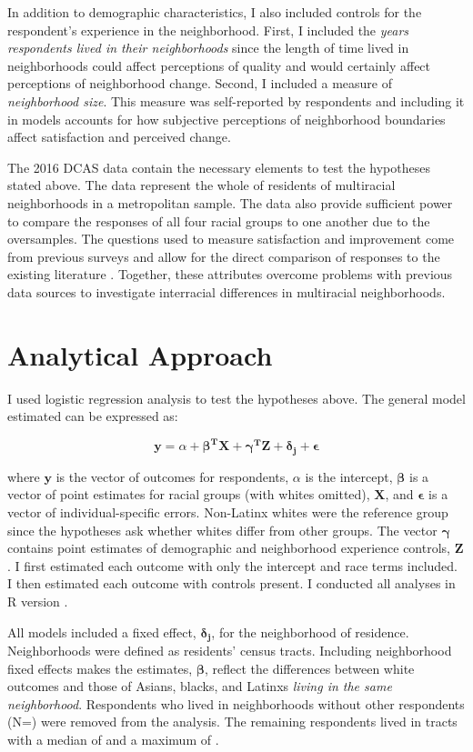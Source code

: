 \documentclass{baderart}
\renewcommand{\needcite}[1][]{%
	\strong{[CITE: %
		\ifthenelse{\equal{#1}{}}{}{: #1}	%
	]}}
\begin{document}
In addition to demographic characteristics, I also included controls for the respondent's experience in the neighborhood. First, I included the \emph{years respondents lived in their neighborhoods} since the length of time lived in neighborhoods could affect perceptions of quality and would certainly affect perceptions of neighborhood change. Second, I included a measure of \emph{neighborhood size}. This measure was self-reported by respondents and including it in models accounts for how subjective perceptions of neighborhood boundaries affect satisfaction and perceived change.

The 2016 DCAS data contain the necessary elements to test the hypotheses stated above. The data represent the whole of residents of multiracial neighborhoods in a metropolitan sample. The data also provide sufficient power to compare the responses of all four racial groups to one another due to the oversamples. The questions used to measure satisfaction and improvement come from previous surveys and allow for the direct comparison of responses to the existing literature\needcite. Together, these attributes overcome problems with previous data sources to investigate interracial differences in multiracial neighborhoods.

\section{Analytical Approach}\label{analytical-approach}

I used logistic regression analysis to test the hypotheses above. The general model estimated can be expressed as:

\[\mathbf{y} = \alpha + \mathbf{\beta^T X} + \mathbf{\gamma^T Z} + \mathbf{\delta_j} + \mathbf{\epsilon}\]

\noindent where \(\mathbf{y}\) is the vector of outcomes for respondents, \(\alpha\) is the intercept, \(\mathbf{\beta}\) is a vector of point estimates for racial groups (with whites omitted), \(\mathbf{X}\), and \(\mathbf{\epsilon}\) is a vector of individual-specific errors. Non-Latinx whites were the reference group since the hypotheses ask whether whites differ from other groups. The vector \(\mathbf{\gamma}\) contains point estimates of demographic and neighborhood experience controls, \(\mathbf{Z}\). I first estimated each outcome with only the intercept and race terms included. I then estimated each outcome with controls present. I conducted all analyses in R version \Rversion.

All models included a fixed effect, \(\mathbf{\delta_j}\), for the neighborhood of residence. Neighborhoods were defined as residents' census tracts. Including neighborhood fixed effects makes the estimates, \(\mathbf{\beta}\), reflect the differences between white outcomes and those of Asians, blacks, and Latinxs \emph{living in the same neighborhood}. Respondents who lived in neighborhoods without other respondents (N=\oneresp) were removed from the analysis. The remaining respondents lived in tracts with a median of \medNpertract and a maximum of \maxNpertract.
\end{document}
